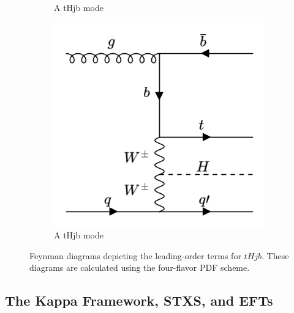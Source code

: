 \begin{figure}[htp]
\begin{subfigure}[b]{0.3\textwidth}
         \caption{A tHjb mode}
         \label{fig:tHjb4}
     \end{subfigure}
     \hfill
         \begin{subfigure}[b]{0.3\textwidth}
         \centering
         \includegraphics[width=\textwidth]{figures/theory_chapter/tHjb5.png}
         \caption{A tHjb mode}
         \label{fig:tHjb5}
     \end{subfigure}
  \label{fig:tHjbmodes}
  \caption{Feynman diagrams depicting the leading-order terms for $tHjb$. These diagrams are calculated using the four-flavor PDF scheme.}  
\end{figure}

\subsection{The Kappa Framework, STXS, and EFTs} \label{sec:kappaFW}


